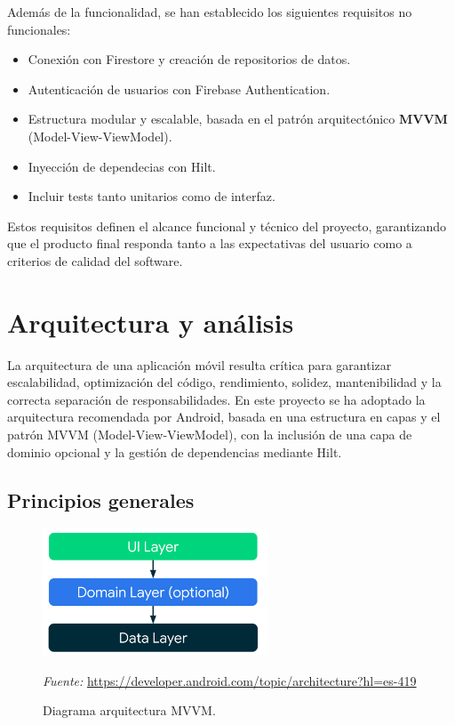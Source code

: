 Además de la funcionalidad, se han establecido los siguientes requisitos no funcionales:

\begin{itemize}
    \item Conexión con Firestore y creación de repositorios de datos.
    \item Autenticación de usuarios con Firebase Authentication.
    \item Estructura modular y escalable, basada en el patrón arquitectónico \textbf{MVVM} (Model-View-ViewModel).
    \item Inyección de dependecias con Hilt.
    \item Incluir tests tanto unitarios como de interfaz. %
\end{itemize}

Estos requisitos definen el alcance funcional y técnico del proyecto, garantizando que el producto final responda tanto a las expectativas del usuario como a criterios de calidad del software.

\section{Arquitectura y análisis}
\label{sec:arquitectura-analisis}

La arquitectura de una aplicación móvil resulta crítica para garantizar escalabilidad, optimización del código, rendimiento, solidez, mantenibilidad y la correcta separación de responsabilidades. En este proyecto se ha adoptado la arquitectura recomendada por Android, basada en una estructura en capas y el patrón MVVM (Model-View-ViewModel), con la inclusión de una capa de dominio opcional y la gestión de dependencias mediante Hilt.

\subsection{Principios generales}

\begin{figure}[H]
\centering
\includegraphics[width=0.6\textwidth]{./img/description/mvvm.png}
\caption{Diagrama arquitectura MVVM.}
\label{fig:mvvm}
\vspace{0.2em}
{\footnotesize \centering \textit{Fuente:} \url{https://developer.android.com/topic/architecture?hl=es-419} \par}
\end{figure}

